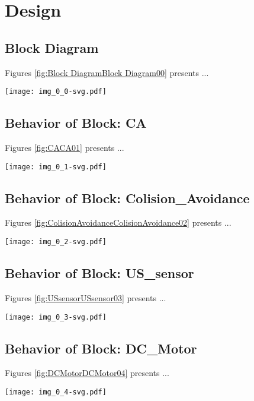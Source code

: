 
\section{Design}
\subsection{Block Diagram}
Figures \ref{fig:Block DiagramBlock Diagram00} presents ...
\begin{figure*}[htb]
\centering
\texttt{[image: img\_0\_0-svg.pdf]}
\caption{Diagram "Block Diagram"}
\label{fig:Block DiagramBlock Diagram00}
\end{figure*}

\subsection{Behavior of Block: CA}
Figures \ref{fig:CACA01} presents ...
\begin{figure*}[htb]
\centering
\texttt{[image: img\_0\_1-svg.pdf]}
\caption{Diagram "Behavior of Block: CA"}
\label{fig:CACA01}
\end{figure*}

\subsection{Behavior of Block: Colision\_Avoidance}
Figures \ref{fig:ColisionAvoidanceColisionAvoidance02} presents ...
\begin{figure*}[htb]
\centering
\texttt{[image: img\_0\_2-svg.pdf]}
\caption{Diagram "Behavior of Block: Colision\_Avoidance"}
\label{fig:ColisionAvoidanceColisionAvoidance02}
\end{figure*}

\subsection{Behavior of Block: US\_sensor}
Figures \ref{fig:USsensorUSsensor03} presents ...
\begin{figure*}[htb]
\centering
\texttt{[image: img\_0\_3-svg.pdf]}
\caption{Diagram "Behavior of Block: US\_sensor"}
\label{fig:USsensorUSsensor03}
\end{figure*}

\subsection{Behavior of Block: DC\_Motor}
Figures \ref{fig:DCMotorDCMotor04} presents ...
\begin{figure*}[htb]
\centering
\texttt{[image: img\_0\_4-svg.pdf]}
\caption{Diagram "Behavior of Block: DC\_Motor"}
\label{fig:DCMotorDCMotor04}
\end{figure*}

